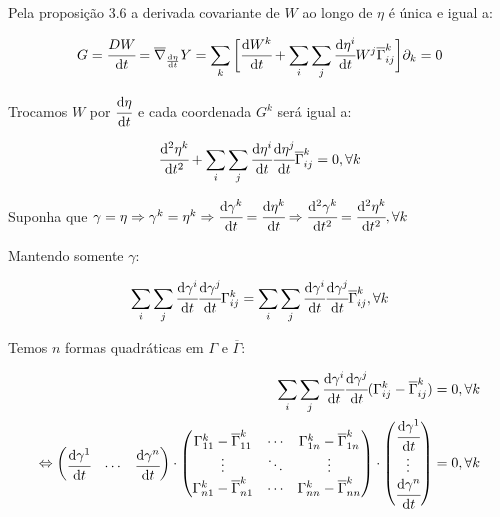 \documentclass[10pt,a4paper]{article}
\begin{document}
		Pela proposi\c{c}\~ao 3.6 a derivada covariante de $W$ ao longo de $\eta$  \'e \'unica e igual a:

		\begin{align*}
		  G = \cfrac{DW}{\mathrm{d} t} = \overline{\nabla}_{\frac{\mathrm{d} \eta}{\mathrm{d} t}} Y = \sum_k \bigg[ \cfrac{\mathrm{d} W^k}{\mathrm{d} t} + \sum_i \sum_j \cfrac{\mathrm{d} \eta^i}{\mathrm{d} t} W^j \overline{\Gamma}_{ij}^k \bigg] \partial_k = 0
		\end{align*}

		Trocamos $W$ por $\cfrac{\mathrm{d} \eta}{\mathrm{d} t}$ e cada coordenada $G^k$ ser\'a igual a:

		\begin{align*}
		  \cfrac{\mathrm{d}^2 \eta^k}{\mathrm{d} t^2} + \sum_i \sum_j \cfrac{\mathrm{d} \eta^i}{\mathrm{d} t} \cfrac{\mathrm{d} \eta^j}{\mathrm{d} t} \overline{\Gamma}_{ij}^k = 0, \forall k
		\end{align*}

		Suponha que $\gamma = \eta \Rightarrow \gamma^k = \eta^k \Rightarrow \cfrac{\mathrm{d} \gamma^k}{\mathrm{d} t} = \cfrac{\mathrm{d} \eta^k}{\mathrm{d} t} \Rightarrow \cfrac{\mathrm{d}^2 \gamma^k}{\mathrm{d} t^2} = \cfrac{\mathrm{d}^2 \eta^k}{\mathrm{d} t^2}, \forall k$

		Mantendo somente $\gamma$:

		\begin{align*}
		  \sum_i \sum_j \cfrac{\mathrm{d} \gamma^i}{\mathrm{d} t} \cfrac{\mathrm{d} \gamma^j}{\mathrm{d} t} \Gamma_{ij}^k = \sum_i \sum_j \cfrac{\mathrm{d} \gamma^i}{\mathrm{d} t} \cfrac{\mathrm{d} \gamma^j}{\mathrm{d} t} \overline{\Gamma}_{ij}^k, \forall k
		\end{align*}

		Temos $n$ formas quadr\'aticas em $\Gamma$ e $\overline{\Gamma}$:

		\begin{align*}
		  \sum_i \sum_j \cfrac{\mathrm{d} \gamma^i}{\mathrm{d} t} \cfrac{\mathrm{d} \gamma^j}{\mathrm{d} t} ( \Gamma_{ij}^k - \overline{\Gamma}_{ij}^k ) &= 0, \forall k \\
		  \Leftrightarrow \left( \begin{matrix} \cfrac{\mathrm{d} \gamma^1}{\mathrm{d} t} & \cdots & \cfrac{\mathrm{d} \gamma^n}{\mathrm{d} t} \end{matrix} \right) \cdot \left( \begin{matrix} \Gamma_{11}^k - \overline{\Gamma}_{11}^k & \cdots & \Gamma_{1n}^k - \overline{\Gamma}_{1n}^k \\ \vdots & \ddots & \vdots \\ \Gamma_{n1}^k - \overline{\Gamma}_{n1}^k & \cdots & \Gamma_{nn}^k - \overline{\Gamma}_{nn}^k \end{matrix} \right) \cdot \left( \begin{matrix} \cfrac{\mathrm{d} \gamma^1}{\mathrm{d} t} \\ \vdots \\ \cfrac{\mathrm{d} \gamma^n}{\mathrm{d} t} \end{matrix} \right) &= 0, \forall k
		\end{align*}
\end{document}
